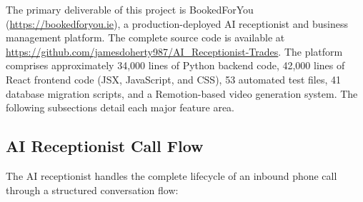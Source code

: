 \documentclass[conference]{IEEEtran}
\begin{document}
The primary deliverable of this project is BookedForYou (\url{https://bookedforyou.ie}), a production-deployed AI receptionist and business management platform. The complete source code is available at \url{https://github.com/jamesdoherty987/AI_Receptionist-Trades}. The platform comprises approximately 34,000 lines of Python backend code, 42,000 lines of React frontend code (JSX, JavaScript, and CSS), 53 automated test files, 41 database migration scripts, and a Remotion-based video generation system. The following subsections detail each major feature area.

\subsection{AI Receptionist Call Flow}

The AI receptionist handles the complete lifecycle of an inbound phone call through a structured conversation flow:
\end{document}
